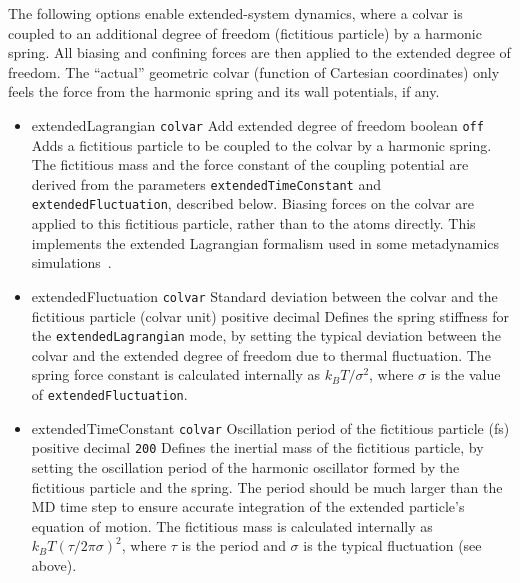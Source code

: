 \label{sec:colvar_extended}

The following options enable extended-system
dynamics, where a colvar is coupled to an additional degree of freedom 
(fictitious particle) by a harmonic spring.
All biasing and confining forces are then applied to the extended degree
of freedom. The ``actual'' geometric colvar (function of Cartesian 
coordinates) only feels the force from the harmonic spring and its wall
potentials, if any.

\begin{itemize}
\item %
  \keydef
    {extendedLagrangian}{%
    \texttt{colvar}}{%
    Add extended degree of freedom}{%
    boolean}{%
    \texttt{off}}{%
    Adds a fictitious particle to be coupled to the colvar by a harmonic
    spring. The fictitious mass and the force constant of the coupling
    potential are derived from the parameters \texttt{extendedTimeConstant}
    and \texttt{extendedFluctuation}, described below. Biasing forces on the
    colvar are applied to this fictitious particle, rather than to the
    atoms directly.  This implements the extended Lagrangian formalism
    used in some metadynamics simulations~\cite{Iannuzzi2003}.
    }

\item %
  \key
    {extendedFluctuation}{%
    \texttt{colvar}}{%
    Standard deviation between the colvar and the fictitious
    particle (colvar unit)}{%
    positive decimal}{%
    Defines the spring stiffness for the \texttt{extendedLagrangian}
    mode, by setting the typical deviation between the colvar and the extended
    degree of freedom due to thermal fluctuation.
    The spring force constant is calculated internally as $k_B T / \sigma^2$,
    where $\sigma$ is the value of \texttt{extendedFluctuation}.}

\item %
  \keydef
    {extendedTimeConstant}{%
    \texttt{colvar}}{%
    Oscillation period of the fictitious particle (fs)}{%
    positive decimal}{%
    \texttt{200}}{%
    Defines the inertial mass of the fictitious particle, by setting the
    oscillation period of the harmonic oscillator formed by the fictitious
    particle and the spring. The period
    should be much larger than the MD time step to ensure accurate integration
    of the extended particle's equation of motion.
    The fictitious mass is calculated internally as $k_B T (\tau/2 \pi \sigma)^2$,
    where $\tau$ is the period and $\sigma$ is the typical fluctuation (see above).}


\end{itemize}
